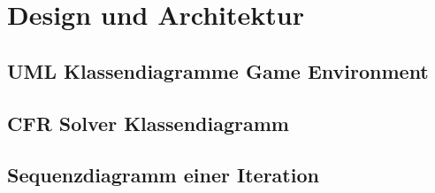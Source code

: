 \chapter{Design und Architektur}

\section{UML Klassendiagramme Game Environment}

\section{CFR Solver Klassendiagramm}

\section{Sequenzdiagramm einer Iteration}

